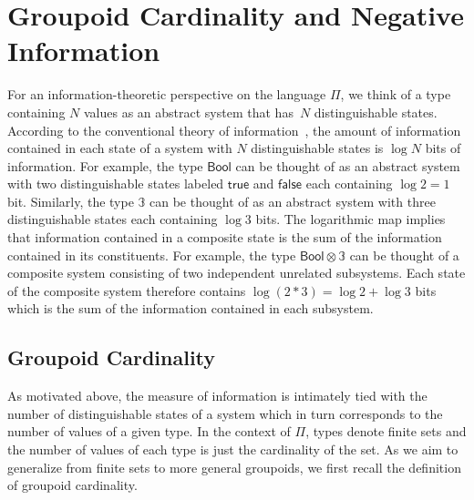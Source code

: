 
\section{Groupoid Cardinality and Negative Information} 

For an information-theoretic perspective on the language $\Pi$, we
think of a type containing $N$ values as an abstract system that
has~$N$ distinguishable states. According to the conventional theory
of information~\cite{Shannon1948}, the amount of information contained
in each state of a system with $N$ distinguishable states is $\log N$
bits of information. For example, the type $\mathsf{Bool}$ can be
thought of as an abstract system with two distinguishable states
labeled $\mathsf{true}$ and $\mathsf{false}$ each containing
$\log 2 = 1$ bit. Similarly, the type $\mathbb{3}$ can be thought of
as an abstract system with three distinguishable states each
containing $\log 3$ bits. The logarithmic map implies that information
contained in a composite state is the sum of the information contained
in its constituents. For example, the type
$\mathsf{Bool} \otimes \mathbb{3}$ can be thought of a composite
system consisting of two independent unrelated subsystems. Each state
of the composite system therefore contains
$\log (2 * 3) = \log 2 + \log 3$ bits which is the sum of the
information contained in each subsystem.

\subsection{Groupoid Cardinality}

As motivated above, the measure of information is intimately tied with
the number of distinguishable states of a system which in turn
corresponds to the number of values of a given type. In the context of
$\Pi$, types denote finite sets and the number of values of each type
is just the cardinality of the set. As we aim to generalize from
finite sets to more general groupoids, we first recall the definition
of groupoid cardinality.

